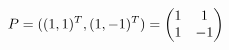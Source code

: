 \documentclass[preview]{standalone}
\begin{document}
\begin{align*}
\special{dvisvgm:raw <g id='unique000'>}P=((1,1)^T,(1,-1)^T)=\begin{pmatrix}1&1\\1&-1\end{pmatrix}\special{dvisvgm:raw </g>}
\end{align*}
\end{document}
